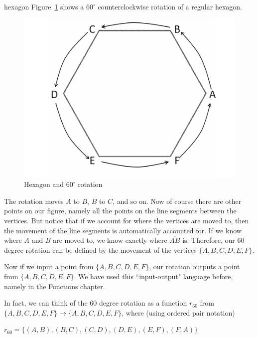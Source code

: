 \begin{example}{hexagon}
Figure~\ref{hex60rot}  shows a $60^\circ$ counterclockwise rotation of a regular hexagon.


\begin{figure}[ht]
\begin{center}
\includegraphics[scale=0.2]{images/hexABCDEF.png}
\caption{Hexagon and  $60^\circ$ rotation}\label{hex60rot}
\end{center}
\end{figure}



The rotation moves $A$ to $B$, $B$ to $C$, and so on.  Now of course there are other points on our figure, namely all the points on the line segments between the vertices.  But notice that if we account for where the vertices are moved to, then the movement of the line segments is automatically accounted for.  If we know where $A$ and $B$ are moved to, we know exactly where $\overline{AB}$ is.  Therefore, our $60$ degree rotation can be defined by the movement of the vertices  $\{A,B,C,D,E,F\}$.  

Now if we input a point from $\{A,B,C,D,E,F\}$, our rotation outputs a point from $\{A,B,C,D,E,F\}$.  We have used this ``input-output" language before, namely in the Functions chapter. 

In fact, we can think of the $60$ degree rotation as a function $r_{60}$ from $\{A,B,C,D,E,F\} \to \{A,B,C,D,E,F\}$, where (using ordered pair notation)
\medskip

$r_{60} = \{ (A,B), (B,C), (C,D), (D,E), (E,F), (F,A) \}$ 

\end{example}


